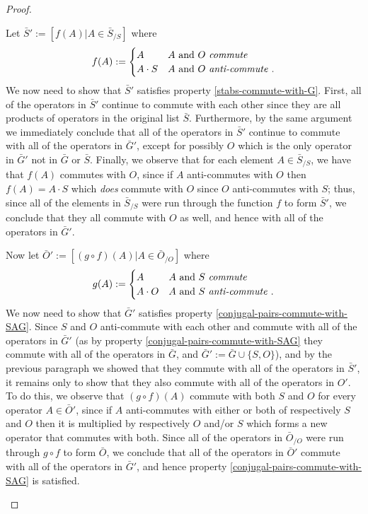 \documentclass[twocolumn,showpacs,preprintnumbers,amsmath,amssymb,nofootinbib,pra,floatfix]{revtex4}
\newcommand{\lst}{\bar}
\begin{document}
\begin{proof}
\begin{description}
Let $\lst S' := [f(A) | A \in \lst S_{\slash S}]$ where $$f(A) :=
\begin{cases}
A & A \text{ and } O \text{ \emph{commute} }\\
A\cdot S  & A \text{ and } O \text{ \emph{anti-commute} }. \\
\end{cases}
$$
We now need to show that $\lst S'$ satisfies property \ref{stabs-commute-with-G}.  First, all of the operators in $\lst S'$ continue to commute with each other since they are all products of operators in the original list $\lst S$.  Furthermore, by the same argument we immediately conclude that all of the operators in $\lst S'$ continue to commute with all of the operators in $\lst G'$, except for possibly $O$ which is the only operator in $\lst G'$ not in $\lst G$ or $\lst S$.  Finally, we observe that for each element $A\in \lst S_{\slash S}$, we have that $f(A)$ commutes with $O$, since if $A$ anti-commutes with $O$ then $f(A)=A\cdot S$ which \emph{does} commute with $O$ since $O$ anti-commutes with $S$;  thus, since all of the elements in $\lst S_{\slash S}$ were run through the function $f$ to form $\lst S'$, we conclude that they all commute with $O$ as well, and hence with all of the operators in $\lst G'$.

Now let $\lst O' := [(g\circ f)(A) | A \in \lst O_{\slash O}]$ where $$g(A) :=
\begin{cases}
A & A \text{ and } S \text{ \emph{commute} }\\
A\cdot O  & A \text{ and } S \text{ \emph{anti-commute} }. \\
\end{cases}
$$
We now need to show that $\lst G'$ satisfies property \ref{conjugal-pairs-commute-with-SAG}.  Since $S$ and $O$ anti-commute with each other and commute with all of the operators in $\lst G'$ (as by property \ref{conjugal-pairs-commute-with-SAG} they commute with all of the operators in $\lst G$, and $\lst G':=\lst G\cup\{S,O\}$), and by the previous paragraph we showed that they commute with all of the operators in $\lst S'$, it remains only to show that they also commute with all of the operators in $O'$.  To do this, we observe that $(g\circ f)(A)$ commute with both $S$ and $O$ for every operator $A\in\lst O'$, since if $A$ anti-commutes with either or both of respectively $S$ and $O$ then it is multiplied by respectively $O$ and/or $S$ which forms a new operator that commutes with both.  Since all of the operators in $\lst O_{\slash O}$  were run through $g\circ f$ to form $\lst O$, we conclude that all of the operators in $\lst O'$ commute with all of the operators in $\lst G'$, and hence property \ref{conjugal-pairs-commute-with-SAG} is satisfied.


\end{description}
\end{proof}
\end{document}
